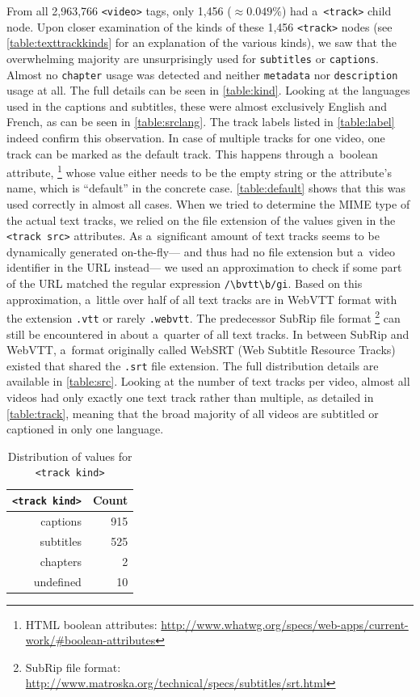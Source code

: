 \documentclass{sig-alternate}
\newcommand{\inlinelistingsize}{\fontsize{8pt}{11pt}}
\let\oldurl\url
\renewcommand{\url}[1]{\inlinelistingsize\oldurl{#1}}
\begin{document}
From all 2,963,766 \texttt{<video>} tags,
only 1,456 (${\approx0.049\%}$) had a~\texttt{<track>} child node.
Upon closer examination of the kinds of these 1,456 \texttt{<track>} nodes
(see \autoref{table:texttrackkinds} for an explanation of the various kinds),
we saw that the overwhelming majority are unsurprisingly
used for \texttt{subtitles} or \texttt{captions}.
Almost no \texttt{chapter} usage was detected
and neither \texttt{metadata} nor \texttt{description} usage at all.
The full details can be seen in \autoref{table:kind}.
Looking at the languages used in the captions and subtitles, 
these were almost exclusively English and French,
as can be seen in \autoref{table:srclang}.
The track labels listed in \autoref{table:label}
indeed confirm this observation.
In case of multiple tracks for one video,
one track can be marked as the default track.
This happens through a~boolean attribute,%
\footnote{HTML boolean attributes:
\url{http://www.whatwg.org/specs/web-apps/current-work/\#boolean-attributes}}
whose value either needs to be the empty string
or the attribute's name,
which is ``default'' in the concrete case.
\autoref{table:default}
shows that this was used correctly in almost all cases.
When we tried to determine the MIME type of the actual
text tracks, we relied on the file extension
of the values given in the \texttt{<track src>} attributes.
As a~significant amount of text tracks
seems to be dynamically generated on-the-fly---%
and thus had no file extension but a~video identifier in the URL instead---%
we used an approximation to check if some part
of the URL matched the regular expression \texttt{/\textbackslash bvtt\textbackslash b/gi}.
Based on this approximation,
a~little over half of all text tracks
are in WebVTT format
with the extension \texttt{.vtt}
or rarely \texttt{.webvtt}.
The predecessor SubRip file format%
\footnote{SubRip file format:
\url{http://www.matroska.org/technical/specs/subtitles/srt.html}}
can still be encountered in about
a~quarter of all text tracks.
In between SubRip and WebVTT, a~format originally called WebSRT
(Web Subtitle Resource Tracks) existed
that shared the \texttt{.srt} file extension.
The full distribution details are available in \autoref{table:src}.
Looking at the number of text tracks per video,
almost all videos had only exactly one text track
rather than multiple, as detailed in \autoref{table:track},
meaning that the broad majority of all videos are subtitled or captioned
in only one language.\vfill

\begin{table}[b!]
  \raggedleft
  \footnotesize
  \begin{tabular}{ r | r }                       
    \texttt{<track kind>} & Count \\
    \hline  
    captions & 915\\
    subtitles & 525\\
    chapters & 2\\
    undefined & 10\\  
  \end{tabular}
  \caption{Distribution of values for
    \texttt{<track kind>}}
  \label{table:kind}
\end{table}
\end{document}
